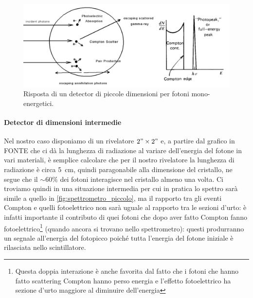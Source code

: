   \begin{figure}[h]
 	\centering
 	\includegraphics[width=\textwidth]{spettrometro_piccolo}
 	\caption{\label{fig:spettrometro_piccolo}Risposta di un detector di piccole dimensioni per fotoni mono-energetici.}
 \end{figure}
 
 \paragraph{Detector di dimensioni intermedie}\label{par:spettrometro_intermedio}
 Nel nostro caso disponiamo di un rivelatore $2"\times2"$ e, a partire dal grafico in FONTE che ci dà la lunghezza di radiazione al variare dell'energia del fotone in vari materiali, è semplice calcolare che per il nostro rivelatore la lunghezza di radiazione è circa \SI{5}{cm}, quindi paragonabile alla dimensione del cristallo, ne segue che il $\sim 60\%$ dei fotoni interagisce nel cristallo almeno una volta. Ci troviamo quindi in una situazione intermedia per cui in pratica lo spettro sarà simile a quello in \autoref{fig:spettrometro_piccolo}, ma il rapporto tra gli eventi Compton e quelli fotoelettrico non sarà uguale al rapporto tra le sezioni d'urto: è infatti importante il contributo di quei fotoni che dopo aver fatto Compton fanno fotoelettrico\footnote{Questa doppia interazione è anche favorita dal fatto che i fotoni che hanno fatto scattering Compton hanno perso energia e l'effetto fotoelettrico ha sezione d'urto maggiore al diminuire dell'energia} (quando ancora si trovano nello spettrometro): questi produrranno un segnale all'energia del fotopicco poiché tutta l'energia del fotone iniziale è rilasciata nello scintillatore. 
 
